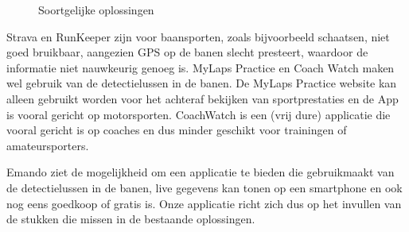 \begin{figure}[ht]

\caption{Soortgelijke oplossingen}
\label{fig:soortgelijke-oplossingen}
\end{figure}

Strava en RunKeeper zijn voor baansporten, zoals bijvoorbeeld schaatsen, niet goed bruikbaar, aangezien GPS op de banen slecht presteert, waardoor de informatie niet nauwkeurig genoeg is. MyLaps Practice en Coach Watch maken wel gebruik van de detectielussen in de banen. De MyLaps Practice website kan alleen gebruikt worden voor het achteraf bekijken van sportprestaties en de App is vooral gericht op motorsporten. CoachWatch is een (vrij dure) applicatie die vooral gericht is op coaches en dus minder geschikt voor trainingen of amateursporters.

Emando ziet de mogelijkheid om een applicatie te bieden die gebruikmaakt van de detectielussen in de banen, live gegevens kan tonen op een smartphone en ook nog eens goedkoop of gratis is. Onze applicatie richt zich dus op het invullen van de stukken die missen in de bestaande oplossingen.